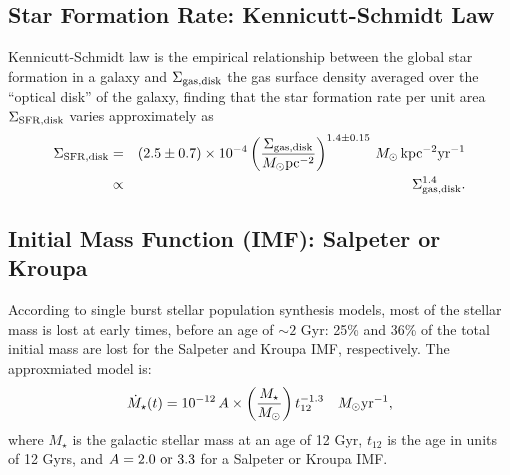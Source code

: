 \subsection{Star Formation Rate: Kennicutt-Schmidt Law}
Kennicutt-Schmidt law is the empirical relationship between the global star formation in a galaxy 
and $\Sigma_{\rm gas,disk}$ the gas surface density averaged over the ``optical disk'' of the galaxy, finding
that the star formation rate per unit area $\Sigma_{\rm SFR,disk}$ varies approximately as
\begin{eqnarray}
    \Sigma_{\rm SFR,disk} &=& (2.5\pm0.7)\times 10^{-4} \left( \frac{\Sigma_{\rm gas,disk}}{M_{\odot}{\rm pc^{-2}}} \right)^{1.4\pm 0.15}\,M_{\odot}\,{\rm kpc^{-2}{yr^{-1}}} \\
                          &\propto& \Sigma_{\rm gas,disk}^{1.4}.
\end{eqnarray}

\bigskip
\subsection{Initial Mass Function (IMF): Salpeter or Kroupa}
According to single burst stellar population synthesis models, most of the stellar mass is lost 
at early times, before an age of $\sim 2$ Gyr: 25\% and 36\% of the total initial mass are lost
for the Salpeter and Kroupa IMF, respectively. The approxmiated model\cite{Kim:13} is:
\begin{equation}
    \dot{M}_{\star}(t) = 10^{-12}\,A\times \left( \frac{M_{\star}}{M_{\odot}} \right) t_{12}^{-1.3}~~~M_{\odot}{\rm yr^{-1}},
\end{equation}
where $M_{\star}$ is the galactic stellar mass at an age of 12 Gyr, $t_{12}$ is the age in units of 12 Gyrs,
and $A=2.0~{\rm or}~3.3$ for a Salpeter or Kroupa IMF.

